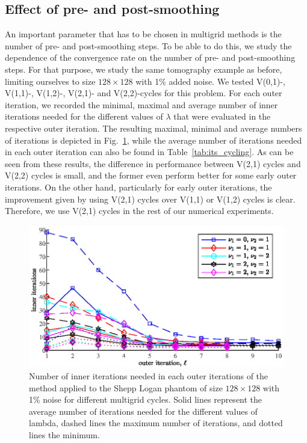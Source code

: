 \subsection{Effect of pre- and post-smoothing}
\label{ssec:relaxation_comparison}
An important parameter that has to be chosen in multigrid methods is the number of pre- and post-smoothing steps. To be able to do this, we study the dependence of the convergence rate on the number of pre- and post-smoothing steps. For that purpose, we study the same tomography example as before, limiting ourselves to size $128 \times 128$ with 1\% added noise. We tested V(0,1)-, V(1,1)-, V(1,2)-, V(2,1)- and V(2,2)-cycles for this problem. For each outer iteration, we recorded the minimal, maximal and average number of inner iterations needed for the different values of $\lambda$ that were evaluated in the respective outer iteration. The resulting maximal, minimal and average numbers of iterations is depicted in Fig.~\ref{fig:its_cycling}, while the average number of iterations needed in each outer iteration can also be found in Table~\ref{tab:its_cycling}. As can be seen from these results, the difference in performance between V(2,1) cycles and V(2,2) cycles is small, and the former even perform better for some early outer iterations.  On the other hand, particularly for early outer iterations, the improvement given by using V(2,1) cycles over V(1,1) or V(1,2) cycles is clear.   Therefore, we use V(2,1) cycles in the rest of our numerical experiments.
\begin{figure}[htbp]
\begin{center}
\includegraphics{figures/its_cycling}
\caption{Number of inner iterations needed in each outer iterations of the method applied to the Shepp Logan phantom of size $128 \times 128$ with 1\% noise for different multigrid cycles. Solid lines represent the average number of iterations needed for the different values of lambda, dashed lines the maximum number of iterations, and dotted lines the minimum.}
\label{fig:its_cycling}
\end{center}
\end{figure}
